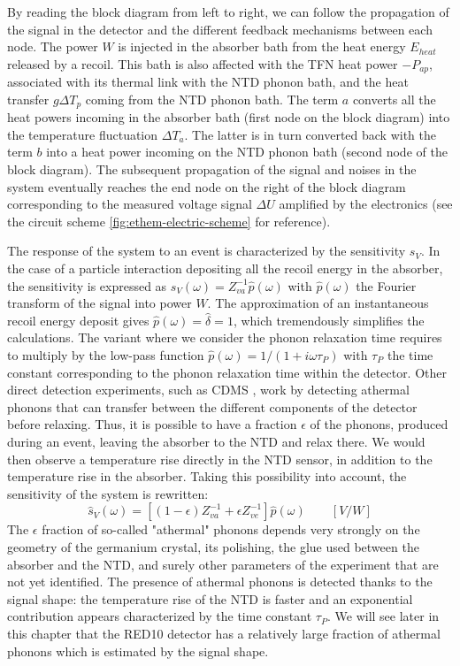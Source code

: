 By reading the block diagram from left to right, we can follow the propagation of the signal in the detector and the different feedback mechanisms between each node. The power $W$ is injected in the absorber bath from the heat energy $E_{heat}$ released by a recoil. This bath is also affected with the TFN heat power $-P_{ap}$, associated with its thermal link with the NTD phonon bath, and the heat transfer $g \Delta T_p$ coming from the NTD phonon bath. The term $a$ converts all the heat powers incoming in the absorber bath (first node on the block diagram) into the temperature fluctuation $\Delta T_a$. The latter is in turn converted back with the term $b$ into a heat power incoming on the NTD phonon bath (second node of the block diagram). The subsequent propagation of the signal and noises in the system eventually reaches the end node on the right of the block diagram corresponding to the measured voltage signal $\Delta U$ amplified by the electronics (see the circuit scheme \ref{fig:ethem-electric-scheme} for reference).


The response of the system to an event is characterized by the sensitivity $s_V$. In the case of a particle interaction depositing all the recoil energy in the absorber, the sensitivity is expressed as ${s}_V(\omega) = Z_{va}^{-1}\hat{p}(\omega)$ with $\hat{p}(\omega)$ the Fourier transform of the signal into power $W$. The approximation of an instantaneous recoil energy deposit gives $\hat{p}(\omega) = \hat{\delta} = 1$, which tremendously simplifies the calculations.
The variant where we consider the phonon relaxation time requires to multiply by the low-pass function $\hat{p}(\omega) = 1/(1+i\omega \tau_P)$ with $\tau_P$ the time constant corresponding to the phonon relaxation time within the detector.
Other direct detection experiments, such as CDMS \cite{Billard:2012}, work by detecting athermal phonons that can transfer between the different components of the detector before relaxing. Thus, it is possible to have a fraction $\epsilon$ of the phonons, produced during an event, leaving the absorber to the NTD and relax there. We would then observe a temperature rise directly in the NTD sensor, in addition to the temperature rise in the absorber. Taking this possibility into account, the sensitivity of the system is rewritten:
\begin{equation}
\label{sv}
\hat{s}_V(\omega) = \left[(1-\epsilon) Z_{va}^{-1} + \epsilon Z_{ve}^{-1}\right]\hat{p}(\omega) \qquad [V/W]
\end{equation}
The $\epsilon$ fraction of so-called "athermal" phonons depends very strongly on the geometry of the germanium crystal, its polishing, the glue used between the absorber and the NTD, and surely other parameters of the experiment that are not yet identified. The presence of athermal phonons is detected thanks to the signal shape: the temperature rise of the NTD is faster and an exponential contribution appears characterized by the time constant $\tau_P$. We will see later in this chapter that the RED10 detector has a relatively large fraction of athermal phonons which is estimated by the signal shape.

